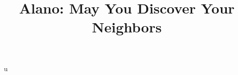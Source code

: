 u\documentclass[conference]{IEEEtran}
\begin{document}
\title{Alano: May You Discover Your Neighbors}



%

\maketitle



\IEEEpeerreviewmaketitle

















\end{document}

